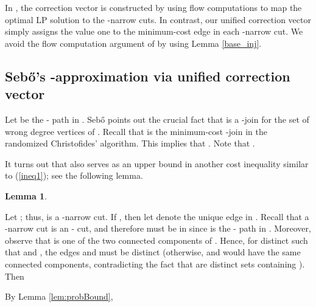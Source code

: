 \documentclass[11pt]{article}
\newcommand{\qed}{\hspace*{\fill}}
\newtheorem{lemma}[theorem]{Lemma}
\newenvironment{proof}[1][Proof. ]{\noindent {\bf #1 }}{\qed}
\begin{document}
In \cite{AKS12}, the correction vector is constructed by using flow
computations to map the optimal LP solution  to the -narrow cuts. In contrast, our unified correction vector simply assigns the
value one to the minimum-cost edge in each -narrow cut. We avoid the flow computation argument of \cite{AKS12} by using Lemma \ref{base_inj}.



\subsection{Seb\H{o}'s -approximation via
unified correction vector}\label{sec:sebo's results}

Let  be the - path in .
Seb\H{o} \cite{sebo13} points out the crucial fact that
 is a -join for the set of wrong degree vertices  of . Recall that  is the
minimum-cost -join in the randomized Christofides' algorithm. This implies that .
Note that .

It turns out that  also serves as
an upper bound in another cost inequality similar to (\ref{ineq1});
see the following lemma.

\begin{lemma}\label{lem:ineq2}

\end{lemma}
\begin{proof}
Let ; thus,  is a -narrow cut.
If ,
then let  denote the unique edge in .
Recall that a -narrow cut is an - cut, and therefore
 must be in  since  is the - path in .
Moreover, observe that  is one of the two connected components of
.
Hence, for distinct 
such that  and ,
the edges  and  must be distinct
(otherwise,  and  would have
the same connected components, contradicting the fact that 
are distinct sets containing ).
Then

By Lemma  \ref{lem:probBound},

\end{proof}
\end{document}
